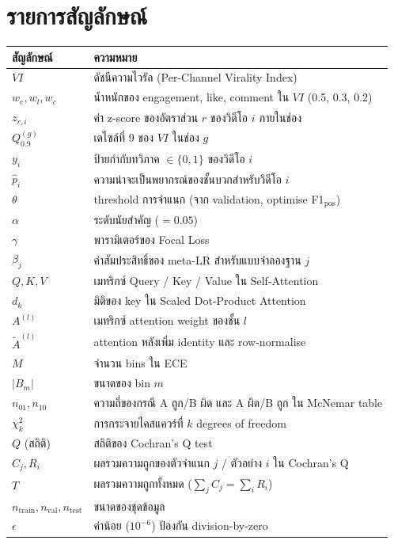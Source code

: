 \chapter*{รายการสัญลักษณ์}

\begin{longtable}{lp{11cm}}
\toprule
\textbf{สัญลักษณ์} & \textbf{ความหมาย} \\
\midrule
\endhead
$\mathit{VI}$              & ดัชนีความไวรัล (Per-Channel Virality Index) \\
$w_e, w_l, w_c$            & น้ำหนักของ engagement, like, comment ใน $\mathit{VI}$ (0.5, 0.3, 0.2) \\
$z_{r,i}$                  & ค่า z-score ของอัตราส่วน $r$ ของวิดีโอ $i$ ภายในช่อง \\
$Q_{0.9}^{(g)}$            & เดไซล์ที่ 9 ของ $\mathit{VI}$ ในช่อง $g$ \\
$y_i$                      & ป้ายกำกับทวิภาค $\in \{0,1\}$ ของวิดีโอ $i$ \\
$\hat p_i$                 & ความน่าจะเป็นพยากรณ์ของชั้นบวกสำหรับวิดีโอ $i$ \\
$\theta$                   & threshold การจำแนก (จาก validation, optimise F1$_{\text{pos}}$) \\
$\alpha$                   & ระดับนัยสำคัญ ($=0.05$) \\
$\gamma$                   & พารามิเตอร์ของ Focal Loss \\
$\beta_j$                  & ค่าสัมประสิทธิ์ของ meta-LR สำหรับแบบจำลองฐาน $j$ \\
$Q, K, V$                  & เมทริกซ์ Query / Key / Value ใน Self-Attention \\
$d_k$                      & มิติของ key ใน Scaled Dot-Product Attention \\
$A^{(l)}$                  & เมทริกซ์ attention weight ของชั้น $l$ \\
$\tilde A^{(l)}$           & attention หลังเพิ่ม identity และ row-normalise \\
$M$                        & จำนวน bins ใน ECE \\
$|B_m|$                    & ขนาดของ bin $m$ \\
$n_{01}, n_{10}$           & ความถี่ของกรณี A ถูก/B ผิด และ A ผิด/B ถูก ใน McNemar table \\
$\chi^2_{k}$               & การกระจายไคสแควร์ที่ $k$ degrees of freedom \\
$Q$ (สถิติ)                & สถิติของ Cochran's Q test \\
$C_j, R_i$                 & ผลรวมความถูกของตัวจำแนก $j$ / ตัวอย่าง $i$ ใน Cochran's Q \\
$T$                        & ผลรวมความถูกทั้งหมด ($\sum_j C_j = \sum_i R_i$) \\
$n_{\text{train}}, n_{\text{val}}, n_{\text{test}}$ & ขนาดของชุดข้อมูล \\
$\epsilon$                 & ค่าน้อย ($10^{-6}$) ป้องกัน division-by-zero \\
\bottomrule
\end{longtable}
\newpage
